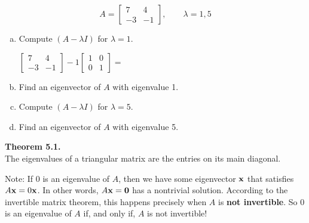 \begin{exercise} %
	$$ A = \begin{bmatrix}7&4\\-3&-1\end{bmatrix}, \qquad \lambda = 1,5 $$
	\begin{multicols}{2}
		\begin{enumerate}[(a)]
			\item Compute $(A-\lambda I)$ for $\lambda=1$.
			
			$\begin{bmatrix}7&4\\-3&-1\end{bmatrix}-1\begin{bmatrix}1&0\\0&1\end{bmatrix}=$
			\vspace{2em}
			\item Find an eigenvector of $A$ with eigenvalue 1.
			\columnbreak
			\item Compute $(A-\lambda I)$ for $\lambda=5$.
			
			\phantom{$\begin{bmatrix}7&4\\-3&-1\end{bmatrix}-5\begin{bmatrix}1&0\\0&1\end{bmatrix}=$}
			\vspace{2em}
			\item Find an eigenvector of $A$ with eigenvalue 5.
		\end{enumerate}
	\end{multicols}
\end{exercise}
\vfill


\newpage


\begin{boxthm}
	\textbf{Theorem 5.1.} \\
	The eigenvalues of a triangular matrix are the entries on its main diagonal.
\end{boxthm}
\vspace{-1em}

\begin{boxme}
	Note: If 0 is an eigenvalue of $A$, then we have some eigenvector $\boldsymbol{\mathbf{x}}$ that satisfies $A\boldsymbol{\mathbf{x}}=0\boldsymbol{\mathbf{x}}$. In other words, $A\boldsymbol{\mathbf{x}}=\boldsymbol{\mathbf{0}}$ has a nontrivial solution. According to the invertible matrix theorem, this happens precisely when $A$ is \textbf{not invertible}. So 0 is an eigenvalue of $A$ if, and only if, $A$ is not invertible!
\end{boxme}

